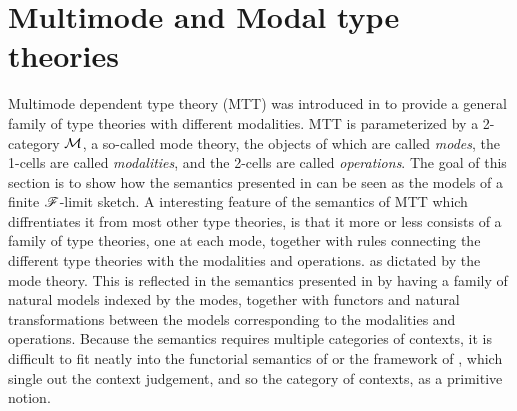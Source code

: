 \documentclass[../thesis.tex]{subfiles}
\begin{document}



\section{Multimode and Modal type theories}
Multimode dependent type theory (MTT) was introduced in \cite{gratzer2021} to provide a general family of type theories
with different modalities. MTT is parameterized by a 2-category ${\mathcal{M}}$, a so-called mode theory, the objects of which
are called \emph{modes}, the 1-cells are called \emph{modalities}, and the 2-cells are called \emph{operations}.
The goal of this section is to show how the semantics presented in \cite{gratzer2021} can be seen as the models of
a finite ${\mathscr{F}}$-limit sketch. A interesting feature of the semantics of MTT which diffrentiates it from most other
type theories, is that it more or less consists of a family of type theories, one at each mode, together with rules
connecting the different type theories with the modalities and operations. as dictated by the mode theory. This is
reflected in the semantics presented in \cite{gratzer2021} by having a family of natural models indexed by the modes,
together with functors and natural transformations between the models corresponding to the modalities and operations.
Because the semantics requires multiple categories of contexts, it is difficult to fit neatly into the functorial
semantics of \cite{uemura2023} or the framework of \cite{coraglia2024a}, which single out the context judgement, and
so the category of contexts, as a primitive notion.
\end{document}
